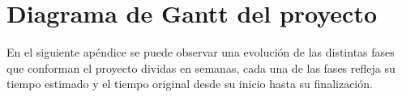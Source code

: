 \documentclass[11pt,spanish,listoffigures,listoftables]{tfgetsinf}
\begin{document}

\APPENDIX

\chapter{Diagrama de Gantt del proyecto}
\label{chap:A1}

En el siguiente apéndice se puede observar una evolución de las distintas fases que conforman el proyecto dividas en semanas,
cada una de las fases refleja su tiempo estimado y el tiempo original desde su inicio hasta su finalización.

\renewcommand\sfdefault{phv}
\renewcommand\mddefault{mc}
\renewcommand\bfdefault{bc}
\end{document}
